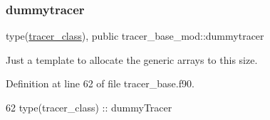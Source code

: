 \subsubsection{\texorpdfstring{dummytracer}{dummytracer}}
{\footnotesize\ttfamily type(\mbox{\hyperlink{structtracer__base__mod_1_1tracer__class}{tracer\+\_\+class}}), public tracer\+\_\+base\+\_\+mod\+::dummytracer}



Just a template to allocate the generic arrays to this size. 



Definition at line 62 of file tracer\+\_\+base.\+f90.


\begin{DoxyCode}
62     \textcolor{keywordtype}{type}(tracer\_class) :: dummyTracer
\end{DoxyCode}
